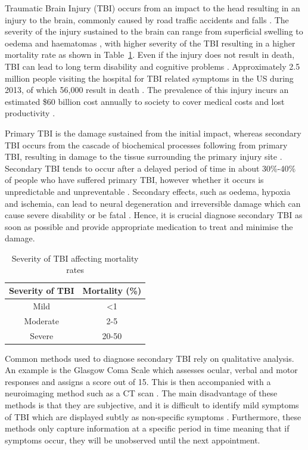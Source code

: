Traumatic Brain Injury (TBI) occurs from an impact to the head resulting in an injury to the brain, commonly caused by road traffic accidents and falls \cite{Langlois2006}. The severity of the injury sustained to the brain can range from superficial swelling to oedema and haematomas , with higher severity of the TBI resulting in a higher mortality rate as shown in Table~\ref{table:severity of TBI}. Even if the injury does not result in death, TBI can lead to long term disability and cognitive problems \cite{WorldHealthOrganisation2006}. Approximately 2.5 million people visiting the hospital for TBI related symptoms in the US during 2013, of which 56,000 result in death \cite{Taylor2017}. The prevalence of this injury incurs an estimated \$60 billion cost annually to society to cover medical costs and lost productivity \cite{Finkelstein2009}. 

Primary TBI is the damage sustained from the initial impact, whereas secondary TBI occurs from the cascade of biochemical processes following from primary TBI, resulting in damage to the tissue surrounding the primary injury site \cite{Norton2008}. Secondary TBI tends to occur after a delayed period of time in about 30\%-40\% of people who have suffered primary TBI, however whether it occurs is unpredictable and unpreventable \cite{Pagkalos2017}. Secondary effects, such as oedema, hypoxia and ischemia, can lead to neural degeneration and irreversible damage which can cause severe disability or be fatal \cite{Murthy2005}. Hence, it is crucial diagnose secondary TBI as soon as possible and provide appropriate medication to treat and minimise the damage.

\begin{table}[H]
\centering
\begin{tabular}{||c c||} 
 \hline
 Severity of TBI & Mortality (\%) \\ [0.5ex] 
 \hline\hline
 Mild & \textless 1 \\ 
 Moderate & 2-5 \\
 Severe & 20-50 \\
 \hline
\end{tabular}
\caption{Severity of TBI affecting mortality rates \cite{WorldHealthOrganisation2006}}
\label{table:severity of TBI}
\end{table}

Common methods used to diagnose secondary TBI rely on qualitative analysis. An example is the Glasgow Coma Scale which assesses ocular, verbal and motor responses and assigns a score out of 15. This is then accompanied with a neuroimaging method such as a CT scan \cite{WorldHealthOrganisation2006}. The main disadvantage of these methods is that they are subjective, and it is difficult to identify mild symptoms of TBI which are displayed subtly as non-specific symptoms \cite{Bettermann2012}. Furthermore, these methods only capture information at a specific period in time meaning that if symptoms occur, they will be unobserved until the next appointment. 

